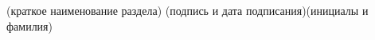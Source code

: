 \begin{titlepage}
\begin{flushleft}
	\normalsize\\
\underline{\hspace{7.5cm}}\hspace{1cm}\underline{\hspace{4cm}}\hspace{1cm}
	\underline{\hspace{4cm}}\\
\vspace{-.2cm}\hspace{1.5cm}\footnotesize(краткое наименование раздела)
	\hspace{2cm}(подпись и дата подписания)\hspace{1.1cm}(инициалы и фамилия)\normalsize\\
\end{flushleft}
	\thispagestyle{empty}
\end{titlepage}
\setcounter{page}{3}